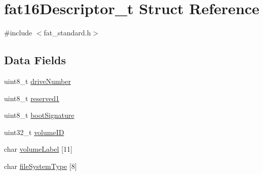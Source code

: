 \hypertarget{structfat16Descriptor__t}{\section{fat16\+Descriptor\+\_\+t Struct Reference}
\label{structfat16Descriptor__t}
}


{\ttfamily \#include $<$fat\+\_\+standard.\+h$>$}

\subsection*{Data Fields}
\begin{DoxyCompactItemize}
\item 
uint8\+\_\+t \hyperlink{structfat16Descriptor__t_ade2e896c317c735ebb46a164851c017b}{drive\+Number}
\item 
uint8\+\_\+t \hyperlink{structfat16Descriptor__t_ab4e4e3dc73321ce02cc033ef4cfd4fa1}{reserved1}
\item 
uint8\+\_\+t \hyperlink{structfat16Descriptor__t_a9c42391c9444b7cc10c6fb81b2a22d5c}{boot\+Signature}
\item 
uint32\+\_\+t \hyperlink{structfat16Descriptor__t_a339a8c42427a236f3d4c9f03a08ba04d}{volume\+I\+D}
\item 
char \hyperlink{structfat16Descriptor__t_ac92cea6596998b85c2ce3954917053ae}{volume\+Label} \mbox{[}11\mbox{]}
\item 
char \hyperlink{structfat16Descriptor__t_a5034a15775b367ee74ad52ab9911ed0c}{file\+System\+Type} \mbox{[}8\mbox{]}
\end{DoxyCompactItemize}


